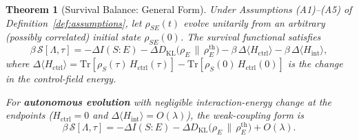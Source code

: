 \documentclass[12pt]{article}
\newtheorem{theorem}{Theorem}
\begin{document}
\begin{theorem}[Survival Balance: General Form]
\label{thm:advantage}
Under Assumptions \textup{(A1)--(A5)} of
Definition~\ref{def:assumptions},
let $\rho_{SE}(t)$ evolve unitarily from an \emph{arbitrary}
(possibly correlated) initial state $\rho_{SE}(0)$.
The survival functional
satisfies
\begin{equation}
\label{eq:advantage}
\boxed{\;
\beta\,\mathcal{S}[\Lambda,\tau]
= -\Delta I(S{:}E)
  - \Delta D_{\mathrm{KL}}\!\bigl(\rho_E \,\big\|\,
    \rho_E^{\mathrm{th}}\bigr)
  - \beta\,\Delta\langle H_{\mathrm{ctrl}} \rangle
  - \beta\,\Delta\langle H_{\mathrm{int}} \rangle,
\;}
\end{equation}
where $\Delta\langle H_{\mathrm{ctrl}} \rangle
= \mathrm{Tr}[\rho_S(\tau)\, H_{\mathrm{ctrl}}(\tau)]
  - \mathrm{Tr}[\rho_S(0)\, H_{\mathrm{ctrl}}(0)]$
is the change in the control-field energy.

For \textbf{autonomous evolution} with negligible interaction-energy
change at the endpoints
($H_{\mathrm{ctrl}} = 0$ and
$\Delta\langle H_{\mathrm{int}}\rangle=O(\lambda)$),
the weak-coupling form is
\begin{equation}
\label{eq:advantage_auto}
\beta\,\mathcal{S}[\Lambda,\tau]
= -\Delta I(S{:}E)
  - \Delta D_{\mathrm{KL}}\!\bigl(\rho_E \,\big\|\,
    \rho_E^{\mathrm{th}}\bigr)+O(\lambda).
\end{equation}
\end{theorem}
\end{document}
